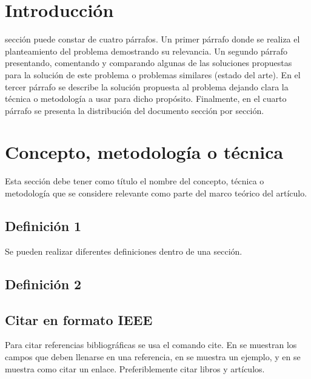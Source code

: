 \section{Introducción}
 sección puede constar de cuatro párrafos. Un primer párrafo donde se realiza el planteamiento del problema demostrando su relevancia. Un segundo párrafo presentando, comentando y comparando algunas de las soluciones propuestas para la solución de este problema o problemas similares (estado del arte). En el tercer párrafo se describe la solución propuesta al problema dejando clara la técnica o metodología a usar para dicho propósito. Finalmente, en el cuarto párrafo se presenta la distribución del documento sección por sección.

\section{Concepto, metodología o técnica}	
Esta sección debe tener como título el nombre del concepto, técnica o metodología que se considere relevante como parte del marco teórico del artículo.
\subsection{Definición 1}
Se pueden realizar diferentes definiciones dentro de una sección.

\subsection{Definición 2}

\subsection{Citar en formato IEEE}
Para citar referencias bibliográficas se usa el comando cite. En \cite{nombre_para_citar} se muestran los campos que deben llenarse en una referencia, en \cite{kopka} se muestra un ejemplo, y en \cite{link} se muestra como citar un enlace. Preferiblemente citar libros y artículos.

